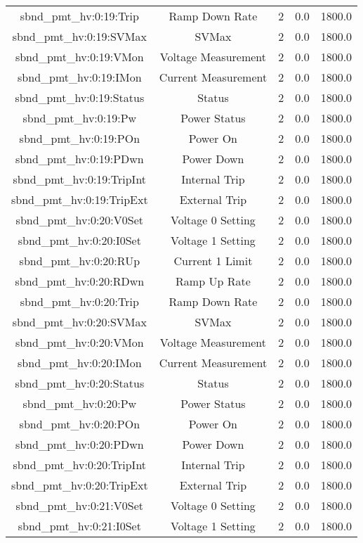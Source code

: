 \begin{center}
\begin{longtable}{c | c c c c }
sbnd\_pmt\_hv:0:19:Trip & Ramp Down Rate & 2 & 0.0 & 1800.0\\ 
sbnd\_pmt\_hv:0:19:SVMax & SVMax & 2 & 0.0 & 1800.0\\ 
sbnd\_pmt\_hv:0:19:VMon & Voltage Measurement & 2 & 0.0 & 1800.0\\ 
sbnd\_pmt\_hv:0:19:IMon & Current Measurement & 2 & 0.0 & 1800.0\\ 
sbnd\_pmt\_hv:0:19:Status & Status & 2 & 0.0 & 1800.0\\ 
sbnd\_pmt\_hv:0:19:Pw & Power Status & 2 & 0.0 & 1800.0\\ 
sbnd\_pmt\_hv:0:19:POn & Power On & 2 & 0.0 & 1800.0\\ 
sbnd\_pmt\_hv:0:19:PDwn & Power Down & 2 & 0.0 & 1800.0\\ 
sbnd\_pmt\_hv:0:19:TripInt & Internal Trip & 2 & 0.0 & 1800.0\\ 
sbnd\_pmt\_hv:0:19:TripExt & External Trip & 2 & 0.0 & 1800.0\\ 
sbnd\_pmt\_hv:0:20:V0Set & Voltage 0 Setting & 2 & 0.0 & 1800.0\\ 
sbnd\_pmt\_hv:0:20:I0Set & Voltage 1 Setting & 2 & 0.0 & 1800.0\\ 
sbnd\_pmt\_hv:0:20:RUp & Current 1 Limit & 2 & 0.0 & 1800.0\\ 
sbnd\_pmt\_hv:0:20:RDwn & Ramp Up Rate & 2 & 0.0 & 1800.0\\ 
sbnd\_pmt\_hv:0:20:Trip & Ramp Down Rate & 2 & 0.0 & 1800.0\\ 
sbnd\_pmt\_hv:0:20:SVMax & SVMax & 2 & 0.0 & 1800.0\\ 
sbnd\_pmt\_hv:0:20:VMon & Voltage Measurement & 2 & 0.0 & 1800.0\\ 
sbnd\_pmt\_hv:0:20:IMon & Current Measurement & 2 & 0.0 & 1800.0\\ 
sbnd\_pmt\_hv:0:20:Status & Status & 2 & 0.0 & 1800.0\\ 
sbnd\_pmt\_hv:0:20:Pw & Power Status & 2 & 0.0 & 1800.0\\ 
sbnd\_pmt\_hv:0:20:POn & Power On & 2 & 0.0 & 1800.0\\ 
sbnd\_pmt\_hv:0:20:PDwn & Power Down & 2 & 0.0 & 1800.0\\ 
sbnd\_pmt\_hv:0:20:TripInt & Internal Trip & 2 & 0.0 & 1800.0\\ 
sbnd\_pmt\_hv:0:20:TripExt & External Trip & 2 & 0.0 & 1800.0\\ 
sbnd\_pmt\_hv:0:21:V0Set & Voltage 0 Setting & 2 & 0.0 & 1800.0\\ 
sbnd\_pmt\_hv:0:21:I0Set & Voltage 1 Setting & 2 & 0.0 & 1800.0\\ 

\end{longtable}
\end{center}
